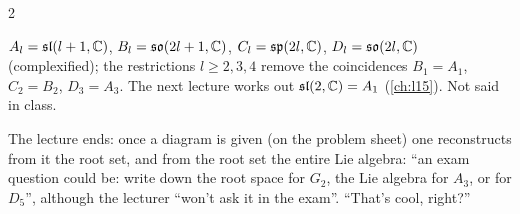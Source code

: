 \begin{paracol}{2}
\begin{coursenote}
\end{coursenote}
\begin{aside}
$A_l=\mathfrak{sl}(l+1,\mathbb{C})$, $B_l=\mathfrak{so}(2l+1,\mathbb{C})$, $C_l=\mathfrak{sp}(2l,\mathbb{C})$, $D_l=\mathfrak{so}(2l,\mathbb{C})$ (complexified); the restrictions $l\ge2,3,4$ remove the coincidences $B_1=A_1$, $C_2=B_2$, $D_3=A_3$. The next lecture works out $\mathfrak{sl}(2,\mathbb{C})=A_1$ (\cref{ch:l15}). Not said in class.
\end{aside}
\begin{coursenote}
The lecture ends: once a diagram is given (on the problem sheet) one reconstructs from it the root set, and from the root set the entire Lie algebra: ``an exam question could be: write down the root space for $G_2$, the Lie algebra for $A_3$, or for $D_5$'', although the lecturer ``won't ask it in the exam''. ``That's cool, right?''   
\end{coursenote}


\end{paracol}
